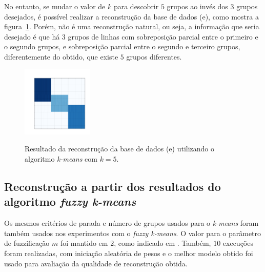 \documentclass[
    12pt,                %
    oneside,            %
    a4paper,            %
    english,            %
    brazil                %
    ]{abntex2ppgsi}
\begin{document}
No entanto, se mudar o valor de $k$ para descobrir $5$ grupos ao invés dos $3$ grupos desejados, é possível realizar a reconstrução da base de dados (e), como mostra a figura~\ref{fig:reconstruction-2:kmeans}.
Porém, não é uma reconstrução natural, ou seja, a informação que seria desejado é que há $3$ grupos de linhas com sobreposição parcial entre o primeiro e o segundo grupos, e sobreposição parcial entre o segundo e terceiro grupos, diferentemente do obtido, que existe $5$ grupos diferentes.

\begin{figure}[H]
\centering
    \caption{Resultado da reconstrução da base de dados (e) utilizando o algoritmo \textit{k-means} com $k = 5$.}
    \includegraphics[width=0.3\textwidth]{img/e-reconstruction-2-kmeans.png}
    \label{fig:reconstruction-2:kmeans}
\end{figure}

\subsection{Reconstrução a partir dos resultados do algoritmo \textit{fuzzy k-means}}
\label{subsec:results-reconstruction-fkmeans}

Os mesmos critérios de parada e número de grupos usados para o \textit{k-means} foram também usados nos experimentos com o \textit{fuzzy k-means}.
O valor para o parâmetro de fuzzificação $m$ foi mantido em $2$, como indicado em .
Também, $10$ execuções foram realizadas, com iniciação aleatória de pesos e o melhor modelo obtido foi usado para avaliação da qualidade de reconstrução obtida.

\end{document}
